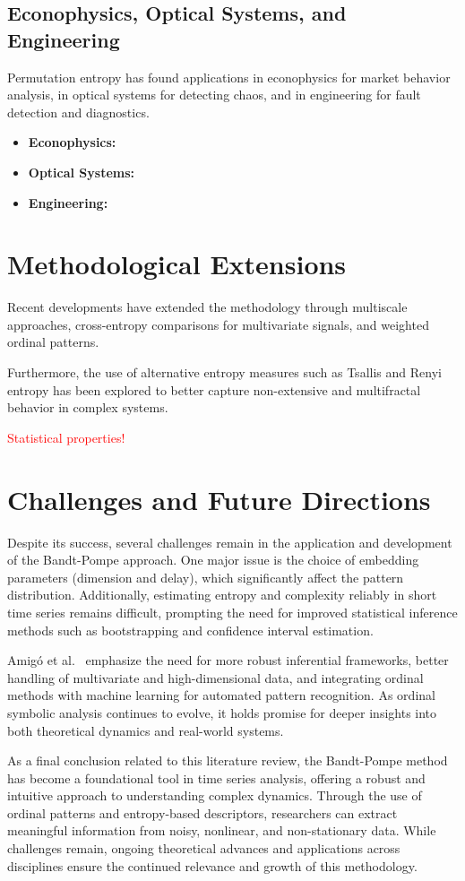 \subsection{Econophysics, Optical Systems, and Engineering}
Permutation entropy has found applications in econophysics for market behavior analysis, in optical systems for detecting chaos, and in engineering for fault detection and diagnostics.
\begin{itemize}
	\item \textbf{Econophysics:}
	
	\item \textbf{Optical Systems:}
	
	\item \textbf{Engineering:}
\end{itemize}

\section{Methodological Extensions}
Recent developments have extended the methodology through multiscale approaches, cross-entropy comparisons for multivariate signals, and weighted ordinal patterns.

Furthermore, the use of alternative entropy measures such as Tsallis and Renyi entropy has been explored to better capture non-extensive and multifractal behavior in complex systems.

\textcolor{red}{Statistical properties!}

\section{Challenges and Future Directions}
Despite its success, several challenges remain in the application and development of the Bandt-Pompe approach. One major issue is the choice of embedding parameters (dimension and delay), which significantly affect the pattern distribution. Additionally, estimating entropy and complexity reliably in short time series remains difficult, prompting the need for improved statistical inference methods such as bootstrapping and confidence interval estimation.

Amigó et al.~\cite{amigo2023ordinal} emphasize the need for more robust inferential frameworks, better handling of multivariate and high-dimensional data, and integrating ordinal methods with machine learning for automated pattern recognition. As ordinal symbolic analysis continues to evolve, it holds promise for deeper insights into both theoretical dynamics and real-world systems.

As a final conclusion related to this literature review, the Bandt-Pompe method has become a foundational tool in time series analysis, offering a robust and intuitive approach to understanding complex dynamics. Through the use of ordinal patterns and entropy-based descriptors, researchers can extract meaningful information from noisy, nonlinear, and non-stationary data. While challenges remain, ongoing theoretical advances and applications across disciplines ensure the continued relevance and growth of this methodology.





